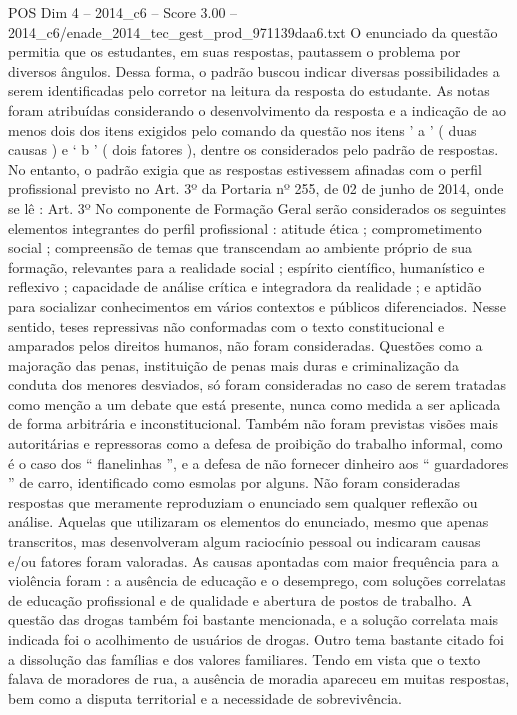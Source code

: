 \begin{textsample}{POS Dim 4 – 2014\_c6 – Score 3.00 – 2014\_c6/enade\_2014\_tec\_gest\_prod\_971139daa6.txt}
O enunciado da questão permitia que os estudantes, em suas respostas, pautassem o problema por diversos ângulos.
Dessa forma, o padrão buscou indicar diversas possibilidades a serem identificadas pelo corretor na leitura da resposta do estudante.
As notas foram atribuídas considerando o desenvolvimento da resposta e a indicação de ao menos dois dos itens exigidos pelo comando da questão nos itens ’ a ’ ( duas causas ) e ‘ b ’ ( dois fatores ), dentre os considerados pelo padrão de respostas.
No entanto, o padrão exigia que as respostas estivessem afinadas com o perfil profissional previsto no Art. 3º da Portaria nº 255, de 02 de junho de 2014, onde se lê : Art. 3º No componente de Formação Geral serão considerados os seguintes elementos integrantes do perfil profissional : atitude ética ; comprometimento social ; compreensão de temas que transcendam ao ambiente próprio de sua formação, relevantes para a realidade social ; espírito científico, humanístico e reflexivo ; capacidade de análise crítica e integradora da realidade ; e aptidão para socializar conhecimentos em vários contextos e públicos diferenciados.
Nesse sentido, teses repressivas não conformadas com o texto constitucional e amparados pelos direitos humanos, não foram consideradas.
Questões como a majoração das penas, instituição de penas mais duras e criminalização da conduta dos menores desviados, só foram consideradas no caso de serem tratadas como menção a um debate que está presente, nunca como medida a ser aplicada de forma arbitrária e inconstitucional.
Também não foram previstas visões mais autoritárias e repressoras como a defesa de proibição do trabalho informal, como é o caso dos “ flanelinhas ”, e a defesa de não fornecer dinheiro aos “ guardadores ” de carro, identificado como esmolas por alguns.
Não foram consideradas respostas que meramente reproduziam o enunciado sem qualquer reflexão ou análise.
Aquelas que utilizaram os elementos do enunciado, mesmo que apenas transcritos, mas desenvolveram algum raciocínio pessoal ou indicaram causas e/ou fatores foram valoradas.
As causas apontadas com maior frequência para a violência foram : a ausência de educação e o desemprego, com soluções correlatas de educação profissional e de qualidade e abertura de postos de trabalho.
A questão das drogas também foi bastante mencionada, e a solução correlata mais indicada foi o acolhimento de usuários de drogas.
Outro tema bastante citado foi a dissolução das famílias e dos valores familiares.
Tendo em vista que o texto falava de moradores de rua, a ausência de moradia apareceu em muitas respostas, bem como a disputa territorial e a necessidade de sobrevivência.

\end{textsample}
